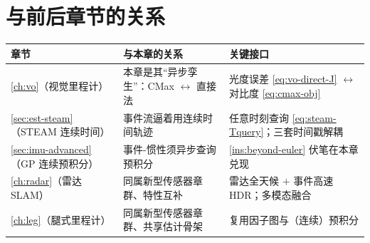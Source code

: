 \section*{与前后章节的关系}
\begin{table}[H]\centering\small
\begin{tabular}{lll}
\toprule
章节 & 与本章的关系 & 关键接口 \\
\midrule
\cref{ch:vo}（视觉里程计）& 本章是其“异步孪生”：CMax $\leftrightarrow$ 直接法 & 光度误差 \cref{eq:vo-direct-J} $\leftrightarrow$ 对比度 \cref{eq:cmax-obj} \\
\cref{sec:est-steam}（STEAM 连续时间）& 事件流逼着用连续时间轨迹 & 任意时刻查询 \cref{eq:steam-Tquery}；三套时间戳解耦 \\
\cref{sec:imu-advanced}（GP 连续预积分）& 事件-惯性须异步查询预积分 & \cref{ins:beyond-euler} 伏笔在本章兑现 \\
\cref{ch:radar}（雷达 SLAM）& 同属新型传感器章群、特性互补 & 雷达全天候 $+$ 事件高速 HDR；多模态融合 \\
\cref{ch:leg}（腿式里程计）& 同属新型传感器章群、共享估计骨架 & 复用因子图与（连续）预积分 \\
\bottomrule
\end{tabular}
\end{table}

